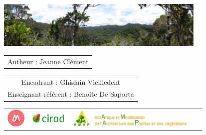 {

  \begin{frame}
    \vspace{0.25cm}
    \titlepage %
    \vspace{-2.5cm}
    \begin{center}
      \includegraphics[width=10cm]{figs/Banniere.png}
    \end{center}
    \begin{center}
          \vspace{0.2cm}
        \begin{tabular}{c}
         Autheur : Jeanne Clément
        \end{tabular}
    
{\small \begin{tabular}{c}
Encadrant : Ghislain Vieilledent \\
Enseignant référent : Benoite De Saporta  
\end{tabular}}

      \vspace{0.2cm}

      \begin{tabular}{C{2cm}C{2cm}C{2cm}C{3cm}}
        \includegraphics[height=0.9cm]{figs/logo_UM.jpg} &
        \includegraphics[height=0.6cm]{figs/logo_Cirad.png} &
        \includegraphics[height=0.9cm]{figs/logo_AMAP.png}
        \includegraphics[height=0.7cm]{figs/AMAP-titre-long.png} &
        ~
      \end{tabular}
      
\end{center}
\end{frame}
}
